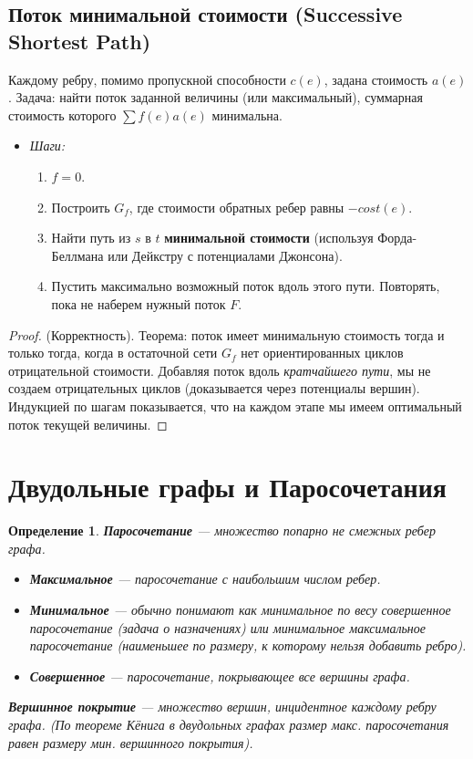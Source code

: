 \documentclass[12pt, a4paper]{article}
\newtheorem{definition}{Определение}
\begin{document}
\subsection{Поток минимальной стоимости (Successive Shortest Path)}
Каждому ребру, помимо пропускной способности $c(e)$, задана стоимость $a(e)$. Задача: найти поток заданной величины (или максимальный), суммарная стоимость которого $\sum f(e)a(e)$ минимальна.
\begin{itemize}
    \item \textit{Шаги:}
    \begin{enumerate}
        \item $f=0$.
        \item Построить $G_f$, где стоимости обратных ребер равны $-cost(e)$.
        \item  Найти путь из $s$ в $t$ \textbf{минимальной стоимости} (используя Форда-Беллмана или Дейкстру с потенциалами Джонсона).
        \item Пустить максимально возможный поток вдоль этого пути. Повторять, пока не наберем нужный поток $F$.
    \end{enumerate}
\end{itemize}
\begin{proof}
(Корректность). Теорема: поток имеет минимальную стоимость тогда и только тогда, когда в остаточной сети $G_f$ нет ориентированных циклов отрицательной стоимости. Добавляя поток вдоль \textit{кратчайшего пути}, мы не создаем отрицательных циклов (доказывается через потенциалы вершин). Индукцией по шагам показывается, что на каждом этапе мы имеем оптимальный поток текущей величины.
\end{proof}

\section{Двудольные графы и Паросочетания}

\begin{definition}
\textbf{Паросочетание} --- множество попарно не смежных ребер графа.
\begin{itemize}
    \item \textbf{Максимальное} --- паросочетание с наибольшим числом ребер.
    \item \textbf{Минимальное} --- обычно понимают как минимальное по весу совершенное паросочетание (задача о назначениях) или минимальное максимальное паросочетание (наименьшее по размеру, к которому нельзя добавить ребро).
    \item \textbf{Совершенное} --- паросочетание, покрывающее все вершины графа.
\end{itemize}
\textbf{Вершинное покрытие} --- множество вершин, инцидентное каждому ребру графа. (По теореме Кёнига в двудольных графах размер макс. паросочетания равен размеру мин. вершинного покрытия).
\end{definition}
\end{document}
